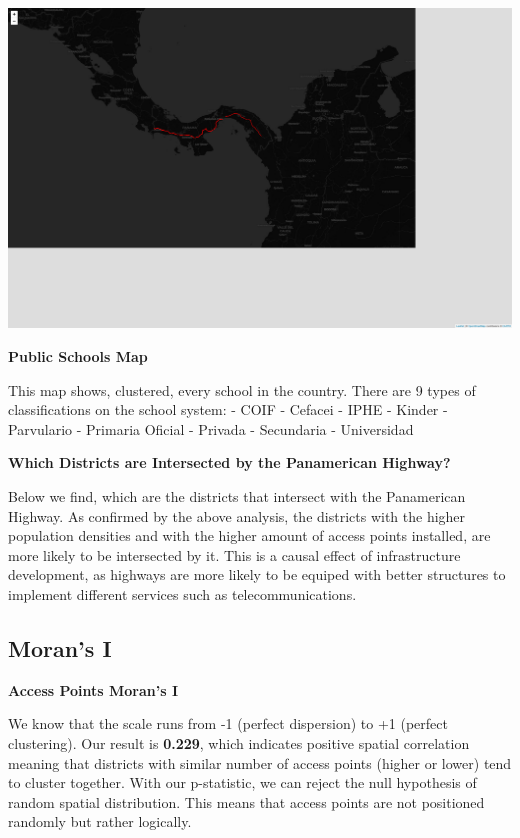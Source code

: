 \documentclass[
  letterpaper,
  DIV=11,
  numbers=noendperiod]{scrartcl}
\begin{document}
\includegraphics{index_files/figure-pdf/panama-highway-1.pdf}

\textbf{Public Schools Map}

This map shows, clustered, every school in the country. There are 9
types of classifications on the school system: - COIF - Cefacei - IPHE -
Kinder - Parvulario - Primaria Oficial - Privada - Secundaria -
Universidad

\textbf{Which Districts are Intersected by the Panamerican Highway?}

Below we find, which are the districts that intersect with the
Panamerican Highway. As confirmed by the above analysis, the districts
with the higher population densities and with the higher amount of
access points installed, are more likely to be intersected by it. This
is a causal effect of infrastructure development, as highways are more
likely to be equiped with better structures to implement different
services such as telecommunications.

\subsection{Moran's I}\label{morans-i}

\textbf{Access Points Moran's I}

We know that the scale runs from -1 (perfect dispersion) to +1 (perfect
clustering). Our result is \textbf{0.229}, which indicates positive
spatial correlation meaning that districts with similar number of access
points (higher or lower) tend to cluster together. With our p-statistic,
we can reject the null hypothesis of random spatial distribution. This
means that access points are not positioned randomly but rather
logically.
\end{document}
